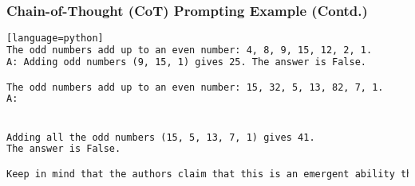 \begin{frame}[fragile]\frametitle{Chain-of-Thought (CoT) Prompting Example (Contd.)}



\begin{lstlisting}[language=HTML][language=python]
The odd numbers add up to an even number: 4, 8, 9, 15, 12, 2, 1.
A: Adding odd numbers (9, 15, 1) gives 25. The answer is False.

The odd numbers add up to an even number: 15, 32, 5, 13, 82, 7, 1. 
A:


Adding all the odd numbers (15, 5, 13, 7, 1) gives 41. 
The answer is False.

Keep in mind that the authors claim that this is an emergent ability that arises with sufficiently large language models.

\end{lstlisting}



\end{frame}






			








			



